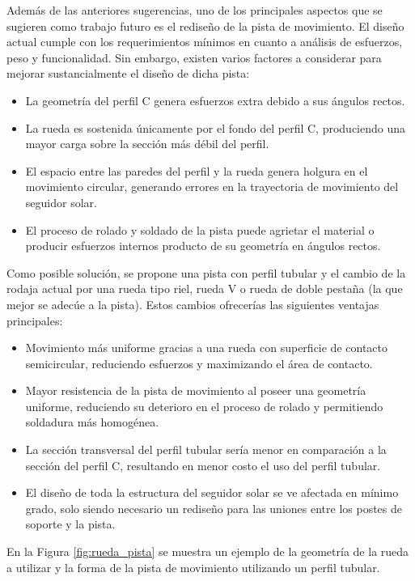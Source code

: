 Además de las anteriores sugerencias, uno de los principales aspectos que se sugieren como trabajo futuro es el rediseño de la pista de movimiento. El diseño actual cumple con los requerimientos mínimos en cuanto a análisis de esfuerzos, peso y funcionalidad. Sin embargo, existen varios factores a considerar para mejorar sustancialmente el diseño de dicha pista:
\renewcommand{\labelitemi}{$\bullet$}
\begin{itemize}
    \item La geometría del perfil C genera esfuerzos extra debido a sus ángulos rectos.
    \item La rueda es sostenida únicamente por el fondo del perfil C, produciendo una mayor carga sobre la sección más débil del perfil.
    \item El espacio entre las paredes del perfil y la rueda genera holgura en el movimiento circular, generando errores en la trayectoria de movimiento del seguidor solar.
    \item El proceso de rolado y soldado de la pista puede agrietar el material o producir esfuerzos internos producto de su geometría en ángulos rectos.
\end{itemize}
Como posible solución, se propone una pista con perfil tubular y el cambio de la rodaja actual por una rueda tipo riel, rueda V o rueda de doble pestaña (la que mejor se adecúe a la pista). Estos cambios ofrecerías las siguientes ventajas principales:
\renewcommand{\labelitemi}{$\checkmark$}
\begin{itemize}
    \item Movimiento más uniforme gracias a una rueda con superficie de contacto semicircular, reduciendo esfuerzos y maximizando el área de contacto.
    \item Mayor resistencia de la pista de movimiento al poseer una geometría uniforme, reduciendo su deterioro en el proceso de rolado y permitiendo soldadura más homogénea.
    \item La sección transversal del perfil tubular sería menor en comparación a la sección del perfil C, resultando en menor costo el uso del perfil tubular.
    \item El diseño de toda la estructura del seguidor solar se ve afectada en mínimo grado, solo siendo necesario un rediseño para las uniones entre los postes de soporte y la pista.
\end{itemize}

En la Figura \ref{fig:rueda_pista} se muestra un ejemplo de la geometría de la rueda a utilizar y la forma de la pista de movimiento utilizando un perfil tubular.

